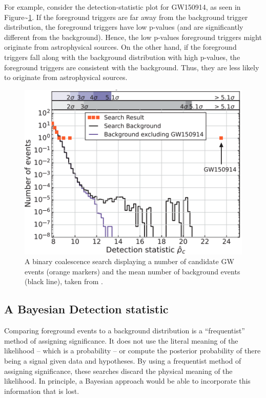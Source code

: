 \documentclass[%
 reprint,
 amsmath,amssymb,
 aps,
]{revtex4}
\begin{document}
For example, consider the
detection-statistic plot for GW150914, as seen in Figure\textasciitilde\ref{fig:GW150914background}. If the
foreground triggers are far away from the background trigger distribution, the foreground triggers have low p-values (and are significantly
different from the background). Hence, the low p-values foreground triggers might originate from astrophysical sources. On the other hand, if the foreground
triggers fall along with the background distribution with high p-values, the foreground triggers are consistent with the background. Thus,
they are less likely to originate from astrophysical sources.



\begin{figure}[!h]

{\centering \includegraphics[width=0.75\linewidth]{images/GW150914_background} 

}

\caption[Ranking statistic plot for GW150914]{A binary coalescence search displaying a number of candidate GW events (orange markers) and the mean number of background events (black line), taken from \citet{abbott2016observation}.}\label{fig:GW150914background}
\end{figure}

\hypertarget{a-bayesian-detection-statistic}{%
\subsection{A Bayesian Detection statistic}\label{a-bayesian-detection-statistic}}

Comparing foreground events to a background distribution is a ``frequentist'' method of assigning significance. It does
not use the literal meaning of the likelihood -- which is a probability -- or compute the posterior probability of there
being a signal given data and hypotheses. By using a frequentist method of assigning significance, these searches
discard the physical meaning of the likelihood. In principle, a Bayesian approach would be able to incorporate this
information that is lost.
\end{document}
